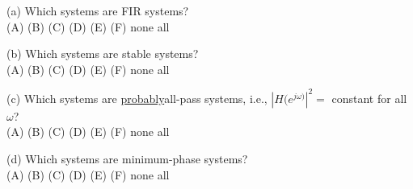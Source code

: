 \documentclass[12pt]{report}
\begin{document}
\begin{description}
	\item{(a) } Which systems are FIR systems? \\
	\hspace{10cm} (A)  \hspace{1cm}  (B)  \hspace{1cm}  (C) \hspace{1cm} (D) \hspace{1cm}  (E) \hspace{1cm} (F) \hspace{1cm} none \hspace{1cm}  all
	
	\item{(b) } Which systems are stable systems? \\
	\hspace{10cm} (A)  \hspace{1cm}  (B)  \hspace{1cm}  (C) \hspace{1cm} (D) \hspace{1cm}  (E) \hspace{1cm} (F) \hspace{1cm} none \hspace{1cm}  all
	
	\item{(c) } Which systems are \underline{probably}\footnotemark  all-pass systems, i.e., ${|H(e^{j\omega)}|}^2=$ constant for all $\omega$? \\
	\hspace{10cm} (A)  \hspace{1cm}  (B)  \hspace{1cm}  (C) \hspace{1cm} (D) \hspace{1cm}  (E) \hspace{1cm} (F) \hspace{1cm} none \hspace{1cm}  all
	
	
	\item{(d) } Which systems are minimum-phase systems? \\
	\hspace{10cm} (A)  \hspace{1cm}  (B)  \hspace{1cm}  (C) \hspace{1cm} (D) \hspace{1cm}  (E) \hspace{1cm} (F) \hspace{1cm} none \hspace{1cm}  all
	

\end{description}
\end{document}
